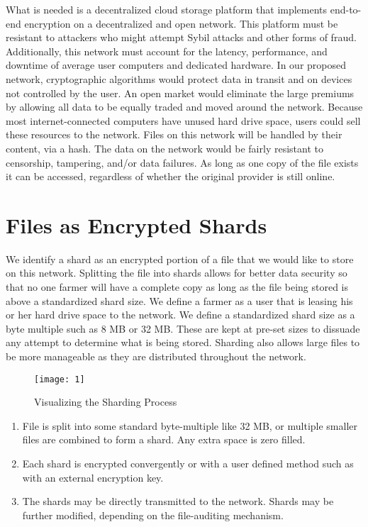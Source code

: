 \documentclass[a4paper,10pt]{article}
\begin{document}
What is needed is a decentralized cloud storage platform that implements end-to-end encryption on a decentralized and open network. This platform must be resistant to attackers who might attempt Sybil attacks and other forms of fraud. Additionally, this network must account for the latency, performance, and downtime of average user computers and dedicated hardware. In our proposed network, cryptographic algorithms would protect data in transit and on devices not controlled by the user. An open market would eliminate the large premiums by allowing all data to be equally traded and moved around the network. Because most internet-connected computers have unused hard drive space, users could sell these resources to the network. Files on this network will be handled by their content, via a hash. The data on the network would be fairly resistant to censorship, tampering, and/or data failures. As long as one copy of the file exists it can be accessed, regardless of whether the original provider is still online.\\

\section{Files as Encrypted Shards}
We identify a shard as an encrypted portion of a file that we would like to store on this network. Splitting the file into shards allows for better data security so that no one farmer will have a complete copy as long as the file being stored is above a standardized shard size. We define a farmer as a user that is leasing his or her hard drive space to the network. We define a standardized shard size as a byte multiple such as 8 MB or 32 MB. These are kept at pre-set sizes to dissuade any attempt to determine what is being stored. Sharding also allows large files to be more manageable as they are distributed throughout the network. 
\\
\begin{figure}[hbt]
\centering
\texttt{[image: 1]}
\caption{Visualizing the Sharding Process}
\end{figure}

\begin{enumerate}
\item File is split into some standard byte-multiple like 32 MB, or multiple smaller files are combined to form a shard. Any extra space is zero filled.
\item Each shard is encrypted convergently or with a user defined method such as with an external encryption key.
\item The shards may be directly transmitted to the network. Shards may be further modified, depending on the file-auditing mechanism.
\end{enumerate}
\end{document}
